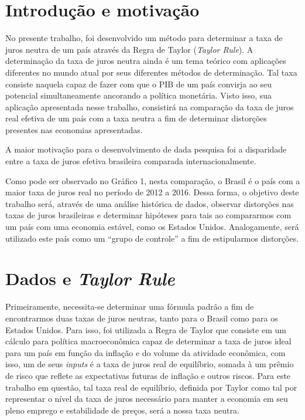 \section*{Introdu\c{c}\~{a}o e motiva\c{c}\~{a}o }

 No presente trabalho, foi desenvolvido um m\'{e}todo para determinar a taxa de juros neutra de um pa\'{i}s atrav\'{e}s da Regra de Taylor (\textit{Taylor Rule}). A determina\c{c}\~{a}o da taxa de juros neutra ainda \'{e} um tema te\'{o}rico com aplica\c{c}\~{o}es diferentes no mundo atual por seus diferentes m\'{e}todos de determina\c{c}\~{a}o. Tal taxa consiste naquela capaz de fazer com que o PIB de um pa\'{i}s convirja ao seu potencial simultaneamente ancorando a pol\'{i}tica monet\'{a}ria. Visto isso, sua aplica\c{c}\~{a}o apresentada nesse trabalho, consistir\'{a} na compara\c{c}\~{a}o da taxa de juros real efetiva de um pa\'{i}s com a taxa neutra a fim de determinar distor\c{c}\~{o}es presentes nas economias apresentadas.

A maior motiva\c{c}\~{a}o para o desenvolvimento de dada pesquisa foi a disparidade entre a taxa de juros efetiva brasileira comparada internacionalmente.


 Como pode ser observado no Gr\'{a}fico 1, nesta compara\c{c}\~{a}o, o Brasil \'{e} o pa\'{i}s com a maior taxa de juros real no per\'{i}odo de 2012 a 2016. Dessa forma, o objetivo deste trabalho ser\'{a}, atrav\'{e}s de uma an\'{a}lise hist\'{o}rica de dados, observar distor\c{c}\~{o}es nas taxas de juros brasileiras e determinar hip\'{o}teses para tais ao compararmos com um pa\'{i}s com uma economia est\'{a}vel, como os Estados Unidos. Analogamente, ser\'{a} utilizado este pa\'{i}s como um ``grupo de controle'' a fim de estipularmos distor\c{c}\~{o}es. 

\section*{Dados e \textit{Taylor Rule} }

 Primeiramente, necessita-se determinar uma f\'{o}rmula padr\~{a}o a fim de encontrarmos duas taxas de juros neutras, tanto para o Brasil como para os Estados Unidos. Para isso, foi utilizada a Regra de Taylor que consiste em um c\'{a}lculo para pol\'{i}tica macroecon\^{o}mica capaz de determinar a taxa de juros ideal para um pa\'{i}s em fun\c{c}\~{a}o da infla\c{c}\~{a}o e do volume da atividade econ\^{o}mica, com isso, um de seus \textit{inputs} \'{e} a taxa de juros real de equil\'{i}brio, somada \`{a} um pr\^{e}mio de risco que reflete as expectativas futuras de infla\c{c}\~{a}o e outros riscos. Para este trabalho em quest\~{a}o, tal taxa real de equil\'{i}brio, definida por Taylor como tal por representar o n\'{i}vel da taxa de juros necess\'{a}rio para manter a economia em seu pleno emprego e estabilidade de pre\c{c}os, ser\'{a} a nossa taxa neutra. 

